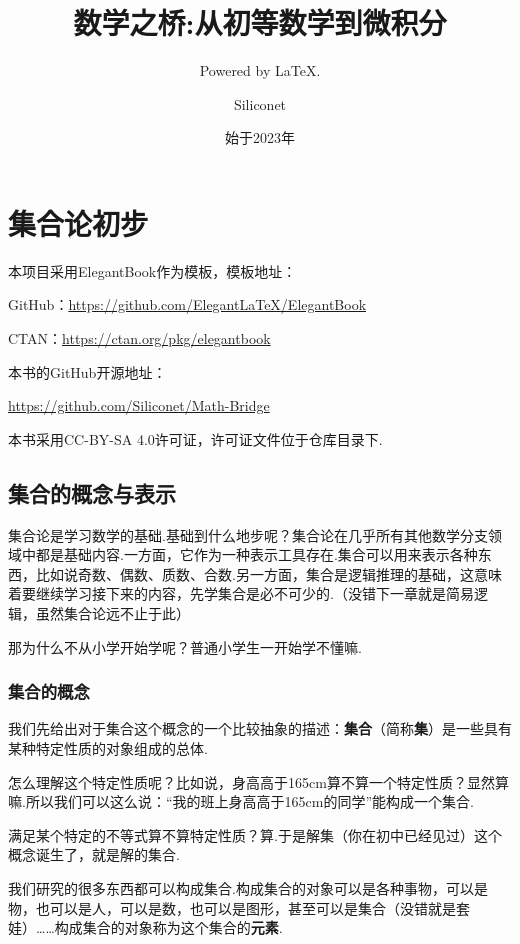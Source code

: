 \documentclass[lang=cn,math=cm,chinesefont=nofont,11pt,scheme=chinese,twocol]{elegantbook}
\title{数学之桥:从初等数学到微积分}
\subtitle{Powered by \LaTeX.}
\author{Siliconet}
\date{始于2023年}
\begin{document}
\maketitle
\frontmatter

\tableofcontents

\mainmatter

\chapter{集合论初步}

本项目采用ElegantBook作为模板，模板地址：

GitHub：\href{https://github.com/ElegantLaTeX/ElegantBook}{https://github.com/ElegantLaTeX/ElegantBook}

CTAN：\href{https://ctan.org/pkg/elegantbook}{https://ctan.org/pkg/elegantbook}

本书的GitHub开源地址：

\href{https://github.com/Siliconet/Math-Bridge}{https://github.com/Siliconet/Math-Bridge}

本书采用CC-BY-SA 4.0许可证，许可证文件位于仓库目录下.

\section{集合的概念与表示}
集合论是学习数学的基础.基础到什么地步呢？集合论在几乎所有其他数学分支领域中都是基础内容.一方面，它作为一种表示工具存在.集合可以用来表示各种东西，比如说奇数、偶数、质数、合数.另一方面，集合是逻辑推理的基础，这意味着要继续学习接下来的内容，先学集合是必不可少的.（没错下一章就是简易逻辑，虽然集合论远不止于此）

那为什么不从小学开始学呢？普通小学生一开始学不懂嘛.

\subsection{集合的概念}

我们先给出对于集合这个概念的一个比较抽象的描述：\textbf{集合}（简称\textbf{集}）是一些具有某种特定性质的对象组成的总体.

怎么理解这个特定性质呢？比如说，身高高于165cm算不算一个特定性质？显然算嘛.所以我们可以这么说：“我的班上身高高于165cm的同学”能构成一个集合.

满足某个特定的不等式算不算特定性质？算.于是解集（你在初中已经见过）这个概念诞生了，就是解的集合.

我们研究的很多东西都可以构成集合.构成集合的对象可以是各种事物，可以是物，也可以是人，可以是数，也可以是图形，甚至可以是集合（没错就是套娃）……构成集合的对象称为这个集合的\textbf{元素}.
\end{document}
